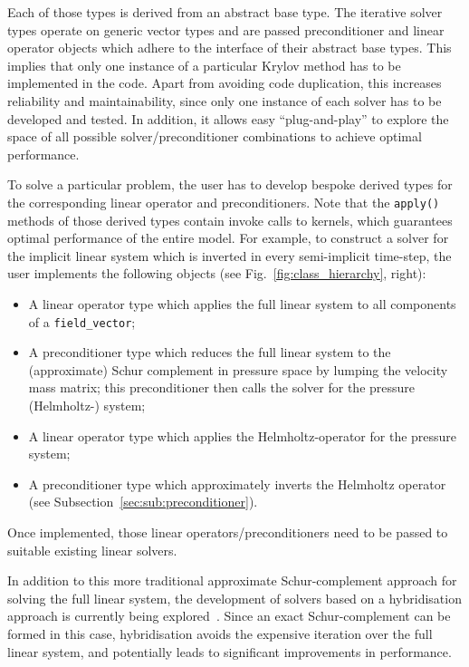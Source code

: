 \documentclass[review,times]{elsarticle}
\begin{document}
Each of those types is derived from an abstract base type. The
iterative solver types operate on generic vector types and are passed
preconditioner and linear operator objects which adhere to the
interface of their abstract base types.  This implies that only one
instance of a particular Krylov method has to be implemented in the
code. Apart from avoiding code duplication, this increases reliability
and maintainability, since only one instance of each solver has to be
developed and tested. In addition, it allows easy ``plug-and-play'' to
explore the space of all possible solver/preconditioner combinations
to achieve optimal performance.

To solve a particular problem, the user has to develop bespoke derived
types for the corresponding linear operator and preconditioners. Note
that the \texttt{apply()} methods of those derived types contain
invoke calls to kernels, which guarantees optimal performance of the entire
model. For example, to construct a solver for the implicit linear
system which is inverted in every semi-implicit time-step, the user
implements the following objects (see Fig.~\ref{fig:class_hierarchy},
right):
\begin{itemize}
\item A linear operator type which applies the full linear system to
  all components of a \texttt{field\_vector};
\item A preconditioner type which reduces the full linear system to
  the (approximate) Schur complement in pressure space by lumping the
  velocity mass matrix; this preconditioner then calls the solver for
  the pressure (Helmholtz-) system;
\item A linear operator type which applies the Helmholtz-operator for
  the pressure system;
\item A preconditioner type which approximately inverts the Helmholtz
  operator (see Subsection~\ref{sec:sub:preconditioner}).
\end{itemize}
Once implemented, those linear operators/preconditioners need to be
passed to suitable existing linear solvers.

In addition to this more traditional approximate Schur-complement
approach for solving the full linear system, the development of
solvers based on a hybridisation approach is currently being 
explored~\cite{cockburnandjay2004,DBLP:journals/corr/abs-1802-00303}. 
Since an exact Schur-complement can be formed in this case, hybridisation
avoids the expensive iteration over the full linear system, and
potentially leads to significant improvements in performance.
\end{document}
